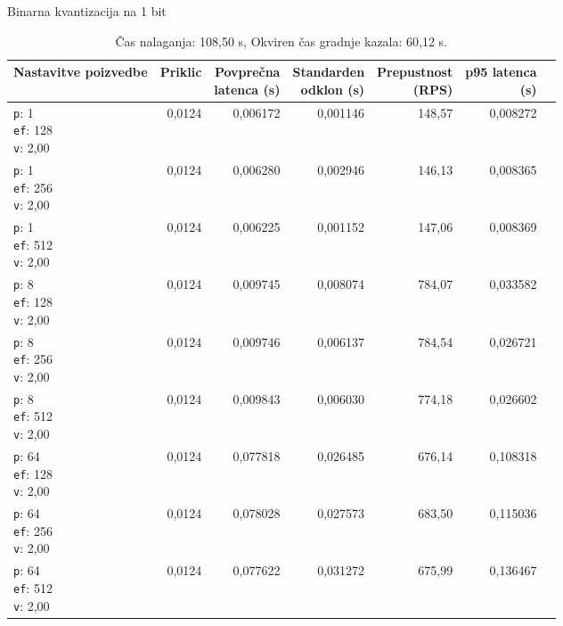 \begin{table}[htbp]
  \centering
\small
  \caption{Binarna kvantizacija na 1 bit}
  \label{tab:single-2cpu-4ram:bq1:qdrant-dipl-baseline-tenant-subgraph-bq1-m16-ef-128-random-768-100-tenants-extended-upload-2026-08-18-07-41-51.json}
  \begin{tabularx}{\textwidth}{Xrrrrrr}
    \toprule
    Nastavitve poizvedbe & Priklic & \makecell{Povprečna\\latenca (s)} & \makecell{Standarden\\odklon (s)} & \makecell{Prepustnost\\(RPS)} & \makecell{p95 latenca\\(s)}  \\
    \midrule
    \makecell{\texttt{p}: 1\\\texttt{ef}: 128\\\texttt{v}: 2,00} & 0,0124 & 0,006172 & 0,001146 & 148,57 & 0,008272 \\
    \makecell{\texttt{p}: 1\\\texttt{ef}: 256\\\texttt{v}: 2,00} & 0,0124 & 0,006280 & 0,002946 & 146,13 & 0,008365 \\
    \makecell{\texttt{p}: 1\\\texttt{ef}: 512\\\texttt{v}: 2,00} & 0,0124 & 0,006225 & 0,001152 & 147,06 & 0,008369 \\
    \makecell{\texttt{p}: 8\\\texttt{ef}: 128\\\texttt{v}: 2,00} & 0,0124 & 0,009745 & 0,008074 & 784,07 & 0,033582 \\
    \makecell{\texttt{p}: 8\\\texttt{ef}: 256\\\texttt{v}: 2,00} & 0,0124 & 0,009746 & 0,006137 & 784,54 & 0,026721 \\
    \makecell{\texttt{p}: 8\\\texttt{ef}: 512\\\texttt{v}: 2,00} & 0,0124 & 0,009843 & 0,006030 & 774,18 & 0,026602 \\
    \makecell{\texttt{p}: 64\\\texttt{ef}: 128\\\texttt{v}: 2,00} & 0,0124 & 0,077818 & 0,026485 & 676,14 & 0,108318 \\
    \makecell{\texttt{p}: 64\\\texttt{ef}: 256\\\texttt{v}: 2,00} & 0,0124 & 0,078028 & 0,027573 & 683,50 & 0,115036 \\
    \makecell{\texttt{p}: 64\\\texttt{ef}: 512\\\texttt{v}: 2,00} & 0,0124 & 0,077622 & 0,031272 & 675,99 & 0,136467 \\
    \bottomrule
  \end{tabularx}
\caption* {Čas nalaganja: 108,50 s, Okviren čas gradnje kazala: 60,12 s.}\end{table}

